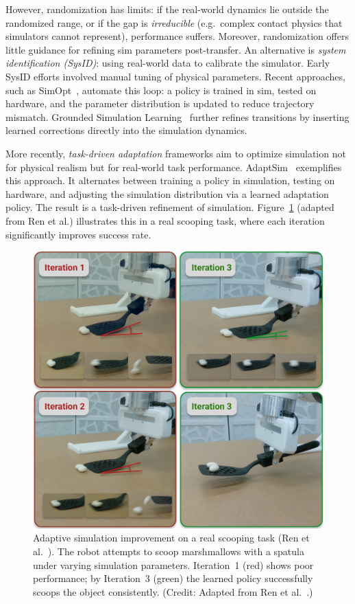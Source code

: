 However, randomization has limits: if the real-world dynamics lie outside the randomized range, or if the gap is \emph{irreducible} (e.g.\ complex contact physics that simulators cannot represent), performance suffers. Moreover, randomization offers little guidance for refining sim parameters post-transfer. An alternative is \emph{system identification (SysID)}: using real-world data to calibrate the simulator. Early SysID efforts involved manual tuning of physical parameters. Recent approaches, such as SimOpt~\cite{Chebotar2019}, automate this loop: a policy is trained in sim, tested on hardware, and the parameter distribution is updated to reduce trajectory mismatch. Grounded Simulation Learning~\cite{Hanna2017} further refines transitions by inserting learned corrections directly into the simulation dynamics.

More recently, \emph{task-driven adaptation} frameworks aim to optimize simulation not for physical realism but for real-world task performance. AdaptSim~\cite{Ren2023} exemplifies this approach. It alternates between training a policy in simulation, testing on hardware, and adjusting the simulation distribution via a learned adaptation policy. The result is a task-driven refinement of simulation. Figure~\ref{fig:adapt_sim} (adapted from Ren et al.) illustrates this in a real scooping task, where each iteration significantly improves success rate.

\begin{figure}[H]
    \centering
    \includegraphics[width=0.95\linewidth]{figures/figAdaptSim.png}
    \caption{Adaptive simulation improvement on a real scooping task (Ren et al.~\cite{Ren2023}). The robot attempts to scoop marshmallows with a spatula under varying simulation parameters. Iteration~1 (red) shows poor performance; by Iteration~3 (green) the learned policy successfully scoops the object consistently. (Credit: Adapted from Ren et al.~\cite{Ren2023}.)}
    \label{fig:adapt_sim}
\end{figure}

